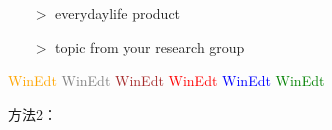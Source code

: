 


\usepackage{bbding}%
\newcommand{\handr}{\textcolor{magenta}{\HandRight}} %

\iffalse
\begin{itemize}
          \item[\(>\)] everydaylife product
          \item[\(>\)] topic from your research group
\end{itemize}

\textcolor{orange}{WinEdt}
\textcolor{gray}{WinEdt}
\textcolor{brown}{WinEdt}
\textcolor{red}{WinEdt}
\textcolor{blue}{WinEdt}
\textcolor{green}{WinEdt}





\begin{frame}

\end{frame}

方法2：

